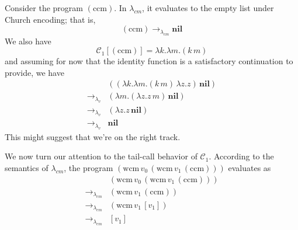\documentclass[ms,electronic,twosidetoc,letterpaper,chaptercenter,parttop]{byumsphd}
\begin{document}
Consider the program $(\mathrm{ccm})$. In $\lambda_{cm}$, it evaluates to the empty list under 
Church encoding; that is,
\[
(\mathrm{ccm})\rightarrow_{\lambda_{cm}}\textbf{nil}
\]
We also have
\[
\mathcal{C}_{1}[(\mathrm{ccm})]=\lambda k.\lambda m.(k\,m)
\]
and assuming for now that the identity function is a satisfactory continuation to provide, 
we have
\begin{align*}
                          &((\lambda k.\lambda m.(k\,m)\,\lambda z.z)\,\textbf{nil})\\
\rightarrow_{\lambda_{v}} &(\lambda m.(\lambda z.z\,m)\,\textbf{nil})\\
\rightarrow_{\lambda_{v}} &(\lambda z.z\,\textbf{nil})\\
\rightarrow_{\lambda_{v}} &\textbf{nil}
\end{align*}
This might suggest that we're on the right track.

We now turn our attention to the tail-call behavior of $\mathcal{C}_{1}$. According to the 
semantics of $\lambda_{cm}$, the program 
$(\mathrm{wcm}\,v_0\,(\mathrm{wcm}\,v_1\,(\mathrm{ccm})))$ evaluates as
\begin{align*}
                          &(\mathrm{wcm}\,v_0\,(\mathrm{wcm}\,v_1\,(\mathrm{ccm})))\\
\rightarrow_{\lambda_{cm}}&(\mathrm{wcm}\,v_1\,(\mathrm{ccm}))\\
\rightarrow_{\lambda_{cm}}&(\mathrm{wcm}\,v_1\,[v_1])\\
\rightarrow_{\lambda_{cm}}&[v_1]
\end{align*}
\end{document}
